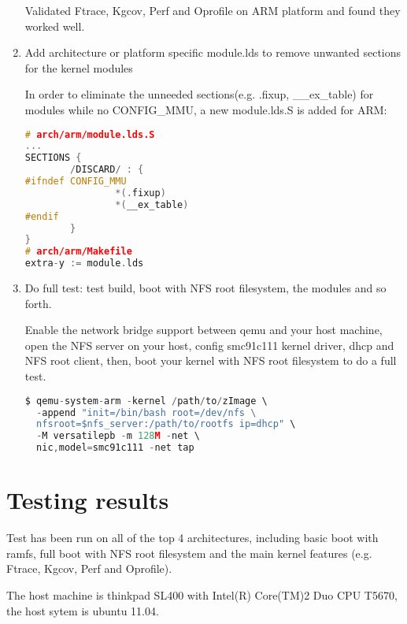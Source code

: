 \documentclass[10pt,a4paper]{article}
\begin{document}
\begin{multicols}{2}
\begin{enumerate}
Validated Ftrace, Kgcov, Perf and Oprofile on ARM platform and found they
worked well.

\item Add architecture or platform specific module.lds to remove unwanted
sections for the kernel modules

In order to eliminate the unneeded sections(e.g. .fixup, \_\_ex\_table) for
modules while no CONFIG\_MMU, a new module.lds.S is added for ARM:

\begin{lstlisting}[language=c,
                  commentstyle=\fontsize{7}{8}\selectfont,
                  basicstyle=\ttfamily\fontsize{7}{8}\selectfont]
# arch/arm/module.lds.S
...
SECTIONS {
        /DISCARD/ : {
#ifndef CONFIG_MMU
                *(.fixup)
                *(__ex_table)
#endif
        }
}
# arch/arm/Makefile
extra-y := module.lds
\end{lstlisting}

\item Do full test: test build, boot with NFS root filesystem, the modules and
so forth.

Enable the network bridge support between qemu and your host machine, open the
NFS server on your host, config smc91c111 kernel driver, dhcp and NFS root
client, then, boot your kernel with NFS root filesystem to do a full test.

\begin{lstlisting}[language=c,
                  commentstyle=\fontsize{7}{8}\selectfont,
                  basicstyle=\ttfamily\fontsize{7}{8}\selectfont]
$ qemu-system-arm -kernel /path/to/zImage \
  -append "init=/bin/bash root=/dev/nfs \
  nfsroot=$nfs_server:/path/to/rootfs ip=dhcp" \
  -M versatilepb -m 128M -net \
  nic,model=smc91c111 -net tap
\end{lstlisting}

\end{enumerate}

\section{Testing results}

Test has been run on all of the top 4 architectures, including basic boot with
ramfs, full boot with NFS root filesystem and the main kernel features (e.g.
Ftrace, Kgcov, Perf and Oprofile).

The host machine is thinkpad SL400 with Intel(R) Core(TM)2 Duo CPU T5670, the
host sytem is ubuntu 11.04.


\end{multicols}
\end{document}
